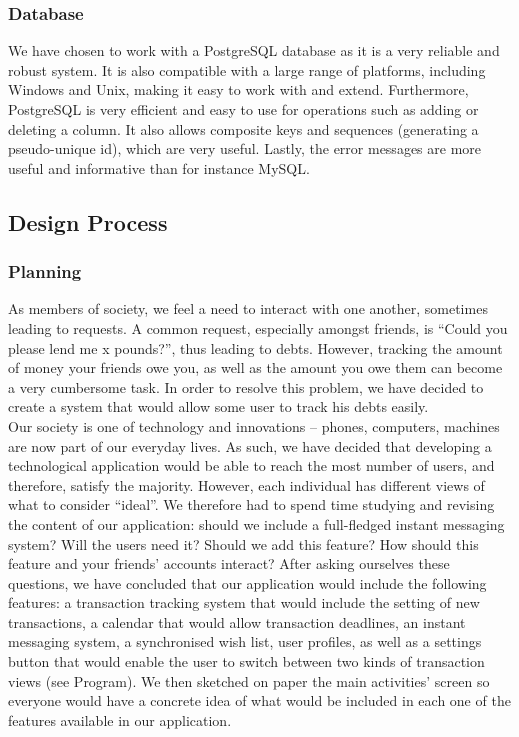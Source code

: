 \documentclass[a4paper,11pt]{article}
\begin{document}
\subsubsection*{Database}
We have chosen to work with a PostgreSQL database as it is a very reliable and robust system. It is also compatible with a large range of platforms, including Windows and Unix, making it easy to work with and extend. Furthermore, PostgreSQL is very efficient and easy to use for operations such as adding or deleting a column. It also allows composite keys and sequences (generating a pseudo-unique id), which are very useful. Lastly, the error messages are more useful and informative than for instance MySQL.

\subsection*{Design Process}
\subsubsection*{Planning}
As members of society, we feel a need to interact with one another, sometimes leading to requests. A common request, especially amongst friends, is “Could you please lend me x pounds?”, thus leading to debts. However, tracking the amount of money your friends owe you, as well as the amount you owe them can become a very cumbersome task. In order to resolve this problem, we have decided to create a system that would allow some user to track his debts easily. \\
Our society is one of technology and innovations – phones, computers, machines are now part of our everyday lives. As such, we have decided that developing a technological application would be able to reach the most number of users, and therefore, satisfy the majority. However, each individual has different views of what to consider “ideal”. We therefore had to spend time studying and revising the content of our application: should we include a full-fledged instant messaging system? Will the users need it? Should we add this feature? How should this feature and your friends’ accounts interact? After asking ourselves these questions, we have concluded that our application would include the following features: a transaction tracking system that would include the setting of new transactions, a calendar that would allow transaction deadlines, an instant messaging system, a synchronised wish list, user profiles, as well as a settings button that would enable the user to switch between two kinds of transaction views (see Program). We then sketched on paper the main activities’ screen so everyone would have a concrete idea of what would be included in each one of the features available in our application.
\end{document}
